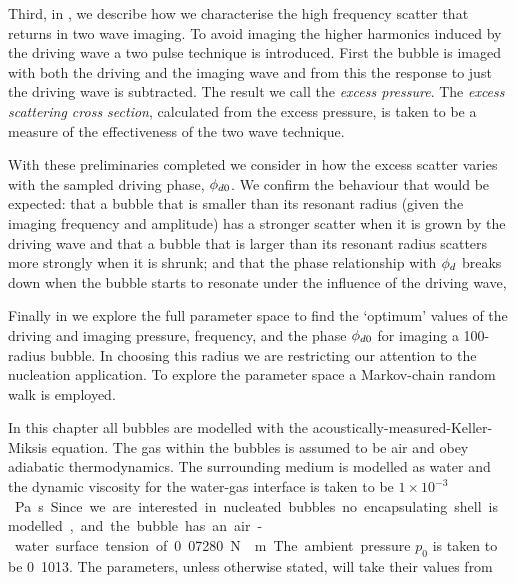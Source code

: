 Third, in  ,
we describe how we characterise the high frequency scatter that returns in two wave imaging.
To avoid imaging the higher harmonics induced by the driving wave   a two pulse technique is introduced.
First the bubble is imaged with  both the driving and the imaging wave and from this the response to just the driving wave is subtracted.
The result we call the {\em excess pressure}.
The {\em excess scattering cross section}, calculated from the excess pressure, is taken to be 
a measure of the effectiveness of the two wave technique.

With these preliminaries completed we consider in  how the excess scatter
varies with the sampled driving phase, ${\phi_{d0}}$.
We confirm the behaviour that would be expected:
that a bubble that is smaller than its resonant radius (given the imaging frequency and amplitude)
has a stronger scatter when it is grown by the driving wave
and that a bubble that is larger than its resonant radius scatters more strongly when it is shrunk;
and that the phase relationship with ${\phi_d}$ breaks down when the 
bubble starts to resonate under the influence of the driving wave,

Finally in  we explore the full  parameter space 
to find the `optimum' values of the driving and imaging pressure, frequency, 
and the phase ${\phi_{d0}}$ for imaging a \unit{100}\nano\metre-radius bubble.
In choosing this radius we are restricting our attention to the nucleation application.
To explore the parameter space a Markov-chain random walk is employed.



In this chapter all bubbles are modelled with the acoustically-measured-Keller-Miksis equation.
The gas within the bubbles is assumed to be air and obey adiabatic thermodynamics.
The surrounding medium is modelled as water and the dynamic viscosity for the water-gas interface
is taken to be  \unit{$1\times10^{-3}$}\pascal\second.
Since we are interested in nucleated bubbles no encapsulating shell is modelled,
and the bubble has an air-water surface tension of  \unit{0.07280}\newton\reciprocal\metre.
The ambient pressure $p_0$ is taken to be \unit{0.1013}\mega\pascal.
The parameters, unless otherwise stated, will take their values from 


